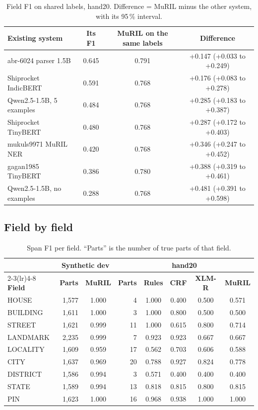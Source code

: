 \documentclass[11pt,a4paper]{article}
\begin{document}
\begin{table}[H]
\centering\small
\caption[MuRIL against the existing parsers]{Field F1 on shared labels, hand20. Difference = MuRIL minus the other system, with its 95\,\% interval.}
\label{tab:compare}
\begin{tabular}{lccc}
\toprule
\textbf{Existing system} & \textbf{Its F1} & \textbf{MuRIL on the same labels} & \textbf{Difference}\\
\midrule
abr-6024 parser 1.5B & 0.645 & 0.791 & +0.147 (+0.033 to +0.249)\\
Shiprocket IndicBERT & 0.591 & 0.768 & +0.176 (+0.083 to +0.278)\\
Qwen2.5-1.5B, 5 examples & 0.484 & 0.768 & +0.285 (+0.183 to +0.387)\\
Shiprocket TinyBERT & 0.480 & 0.768 & +0.287 (+0.172 to +0.403)\\
mukuls9971 MuRIL NER & 0.420 & 0.768 & +0.346 (+0.247 to +0.452)\\
gagan1985 TinyBERT & 0.386 & 0.780 & +0.388 (+0.319 to +0.461)\\
Qwen2.5-1.5B, no examples & 0.288 & 0.768 & +0.481 (+0.391 to +0.598)\\
\bottomrule
\end{tabular}
\end{table}

\subsection{Field by field}
\begin{table}[H]
\centering\small
\caption[Span F1 per field]{Span F1 per field. ``Parts'' is the number of true parts of that field.}\label{tab:perlabel}
\begin{tabular}{lrcrcccc}
\toprule
& \multicolumn{2}{c}{\textbf{Synthetic dev}} & \multicolumn{5}{c}{\textbf{hand20}}\\
\cmidrule(lr){2-3}\cmidrule(lr){4-8}
\textbf{Field} & \textbf{Parts} & \textbf{MuRIL} & \textbf{Parts} & \textbf{Rules} & \textbf{CRF} & \textbf{\mbox{XLM-R}} &
\textbf{MuRIL}\\
\midrule
HOUSE & 1,577 & 1.000 & 4 & 1.000 & 0.400 & 0.500 & 0.571\\
BUILDING & 1,611 & 1.000 & 3 & 1.000 & 0.800 & 0.500 & 0.500\\
STREET & 1,621 & 0.999 & 11 & 1.000 & 0.615 & 0.800 & 0.714\\
LANDMARK & 2,235 & 0.999 & 7 & 0.923 & 0.923 & 0.667 & 0.667\\
LOCALITY & 1,609 & 0.959 & 17 & 0.562 & 0.703 & 0.606 & 0.588\\
CITY & 1,637 & 0.969 & 20 & 0.788 & 0.927 & 0.824 & 0.778\\
DISTRICT & 1,586 & 0.994 & 3 & 0.571 & 0.400 & 0.400 & 0.400\\
STATE & 1,589 & 0.994 & 13 & 0.818 & 0.815 & 0.800 & 0.815\\
PIN & 1,623 & 1.000 & 16 & 0.968 & 0.938 & 1.000 & 1.000\\
\bottomrule
\end{tabular}
\end{table}
\end{document}
